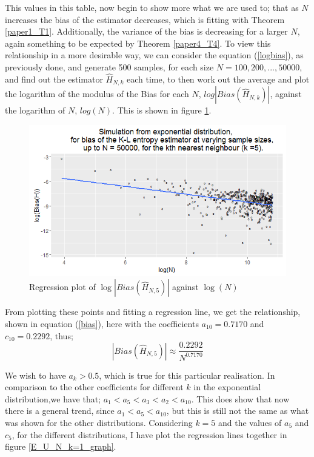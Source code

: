 \documentclass{article}
\begin{document}
This values in this table, now begin to show more what we are used to; that as $N$ increases the bias of the estimator decreases, which is fitting with Theorem \ref{paper1_T1}. Additionally, the variance of the bias is decreasing for a larger $N$, again something to be expected by Theorem \ref{paper4_T4}. To view this relationship in a more desirable way, we can consider the equation (\ref{logbias}), as previously done, and generate 500 samples, for each size $N = 100, 200, ... ,50000$, and find out the estimator $\hat{H}_{N,k}$ each time, to then work out the average and plot the logarithm of the modulus of the Bias for each $N$, $log|Bias(\hat{H}_{N,k})|$, against the logarithm of $N$, $log(N)$. This is shown in figure \ref{expo_k=5_graph}.

\begin{figure}
  \begin{center}
    \includegraphics[width=\textwidth]{./Graphs/Expo_k=5_plot.png}
  \end{center}
\caption{Regression plot of $\log|Bias(\hat{H}_{N, 5})|$ against $\log(N)$}
  \label{expo_k=5_graph}
\end{figure}

From plotting these points and fitting a regression line, we get the relationship, shown in equation (\ref{bias}), here with the coefficients $a_{10}=0.7170$ and $c_{10}=0.2292$, thus;
\begin{equation}
|Bias(\hat{H}_{N, 5})| \approx \frac{0.2292}{N^{0.7170}}\nonumber
\end{equation}

We wish to have $a_{k}>0.5$, which is true for this particular realisation. In comparison to the other coefficients for different $k$ in the exponential distribution,we have that; $a_{1} < a_{5} < a_{3} < a_{2} < a_{10}$. This does show that now there is a general trend, since $a_{1} < a_{5} < a_{10}$, but this is still not the same as what was shown for the other distributions. Considering $k=5$ and the values of $a_{5}$ and $c_{5}$, for the different distributions, I have plot the regression lines together in figure \ref{E_U_N_k=1_graph}.
\end{document}
